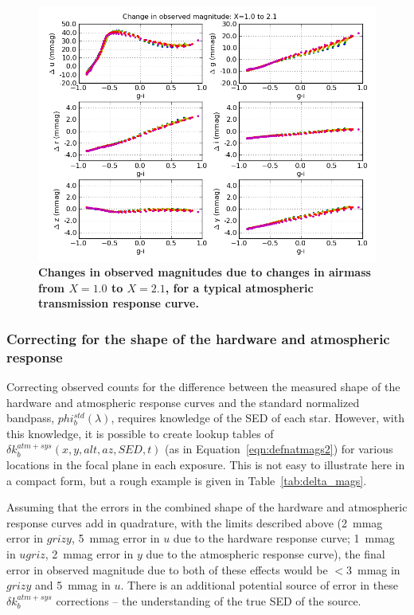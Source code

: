 \documentclass[12pt,preprint]{aastex}
\begin{document}
\begin{figure}
\centering
\includegraphics[width=6in]{delta_mags_airmass_big}
\caption{{\small
{\bf Changes in observed magnitudes due to changes in airmass from $X=1.0$ 
to $X=2.1$, for a typical atmospheric transmission response curve.}
}}
\label{fig:dmag_airmass}
\end{figure}


\subsubsection{Correcting for the shape of the hardware and atmospheric response}
\label{sec:apply_deltak}

Correcting observed counts for the difference between the measured
shape of the hardware and atmospheric response curves and the standard
normalized bandpass, $phi_b^{std}(\lambda)$, requires knowledge of the
SED of each star. However, with this knowledge, it is possible to
create lookup tables of $\delta k_b^{atm+sys}(x,y,alt,az,SED,t)$ (as
in Equation~\ref{eqn:defnatmags2}) for various locations in the focal
plane in each exposure. This is not easy to illustrate here in a
compact form, but a rough example is given in
Table~\ref{tab:delta_mags}.

Assuming that the errors in the combined shape of the hardware and atmospheric
response curves add in quadrature, with the limits described above (2~mmag error
in $grizy$,  5~mmag error in $u$ due to the hardware response curve; 
1~mmag in $ugriz$, 2~mmag error in $y$ due to the atmospheric response curve), 
the final error in observed magnitude due to both of these effects would be $<3$~mmag
in $grizy$ and 5~mmag in $u$. There is an additional potential source of error in these
$\delta k_b^{atm+sys}$ corrections -- the understanding of the true SED of the 
source. 
\end{document}
